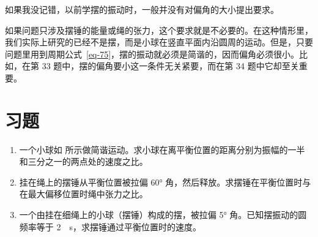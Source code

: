 \begin{dialogue}
\stdb 如果我没记错，以前学摆的振动时，一般并没有对偏角的大小提出要求。

\tchr 如果问题只涉及摆锤的能量或绳的张力，这个要求就是不必要的。在这种情形里，我们实际上研究的已经不是摆，而是小球在竖直平面内沿圆周的运动。但是，只要问题里用到周期公式~\eqref{eq-75}，摆的振动就必须是简谐的，因而偏角必须很小。比如，在第 33 题中，摆的偏角要小这一条件无关紧要，而在第 34 题中它却至关重要。

\end{dialogue}

\section*{习题}
\label{prob-11}

\begin{enumerate}[resume*=problems]
\item 一个小球如 所示做简谐运动。求小球在离平衡位置的距离分别为振幅的一半和三分之一的两点处的速度之比。

\item 挂在绳上的摆锤从平衡位置被拉偏 \ang{60} 角，然后释放。求摆锤在平衡位置时与在最大偏移位置时绳中张力之比。

\item 一个由挂在细绳上的小球（摆锤）构成的摆，被拉偏 \ang{5} 角。已知摆振动的圆频率等于 \SI{2}{\per\second}，求摆锤通过平衡位置时的速度。
\end{enumerate}



